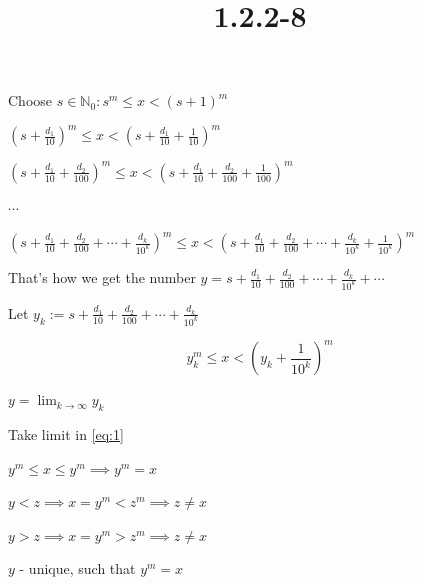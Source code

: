 \documentclass{article}
\title{1.2.2-8}
\begin{document}
\maketitle

Choose \( s \in \mathbb{N}_0: s^{m} \leq x < (s+1)^{m} \)

\( (s + \frac{d_1}{10})^m \leq x < (s + \frac{d_1}{10} + \frac{1}{10})^m \)

\( (s + \frac{d_1}{10} + \frac{d_2}{100})^m \leq x < (s + \frac{d_1}{10} + \frac{d_2}{100} + \frac{1}{100})^m \)

\( \cdots \)

\( (s + \frac{d_1}{10} + \frac{d_2}{100} + \cdots + \frac{d_k}{10^k})^m \leq x < (s + \frac{d_1}{10} + \frac{d_2}{100} + \cdots + \frac{d_k}{10^k} + \frac {1}{10^k})^m \)

That's how we get the number \( y = s + \frac{d_1}{10} + \frac{d_2}{100} + \cdots + \frac{d_k}{10^k} + \cdots \)

Let \( y_k := s + \frac{d_1}{10} + \frac{d_2}{100} + \cdots + \frac{d_k}{10^k} \)

\[y_k^m \leq x < (y_k + \frac{1}{10^k})^m \tag{1}\label{eq:1}\]

\( y = \lim_{k \to \infty} y_k \)

Take limit in \eqref{eq:1}

\( y^m \leq x \leq y^m \implies y^m = x \)

\( y < z \implies x = y^m < z^m \implies z \neq x \)

\( y > z \implies x = y^m > z^m \implies z \neq x \)

\( y \) - unique, such that \( y^m = x \)
\end{document}
